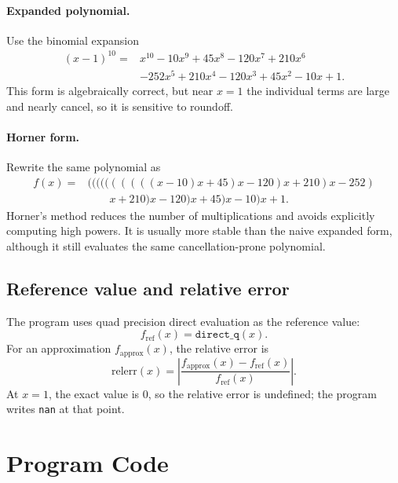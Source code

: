 \documentclass[12pt,a4paper]{article}
\begin{document}
\paragraph{Expanded polynomial.}
Use the binomial expansion
\[
\begin{aligned}
(x-1)^{10}={}&x^{10}-10x^9+45x^8-120x^7+210x^6 \\
&-252x^5+210x^4-120x^3+45x^2-10x+1.
\end{aligned}
\]
This form is algebraically correct, but near $x=1$ the individual terms are large and nearly cancel, so it is sensitive to roundoff.

\paragraph{Horner form.}
Rewrite the same polynomial as
\[
\begin{aligned}
f(x)=&((((((((((x-10)x+45)x-120)x+210)x-252) \\
&\qquad x+210)x-120)x+45)x-10)x+1.
\end{aligned}
\]
Horner's method reduces the number of multiplications and avoids explicitly computing high powers. It is usually more stable than the naive expanded form, although it still evaluates the same cancellation-prone polynomial.

\subsection{Reference value and relative error}
The program uses quad precision direct evaluation as the reference value:
\[
    f_{\mathrm{ref}}(x)=\texttt{direct\_q}(x).
\]
For an approximation $f_{\mathrm{approx}}(x)$, the relative error is
\[
    \mathrm{relerr}(x)=\left|\frac{f_{\mathrm{approx}}(x)-f_{\mathrm{ref}}(x)}{f_{\mathrm{ref}}(x)}\right|.
\]
At $x=1$, the exact value is $0$, so the relative error is undefined; the program writes \texttt{nan} at that point.

\section{Program Code}
\end{document}
